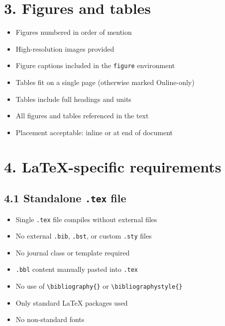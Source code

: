 \documentclass[11pt]{article}
\begin{document}
\begin{Form}
\section*{3. Figures and tables}

\begin{itemize}[leftmargin=1.5cm]
    \item \CheckBox{} Figures numbered in order of mention
    \item \CheckBox{} High-resolution images provided
    \item \CheckBox{} Figure captions included in the \texttt{figure} environment
    \item \CheckBox{} Tables fit on a single page (otherwise marked Online-only)
    \item \CheckBox{} Tables include full headings and units
    \item \CheckBox{} All figures and tables referenced in the text
    \item \CheckBox{} Placement acceptable: inline or at end of document
\end{itemize}

\section*{4. LaTeX-specific requirements}

\subsection*{4.1 Standalone \texttt{.tex} file}

\begin{itemize}[leftmargin=1.5cm]
    \item \CheckBox{} Single \texttt{.tex} file compiles without external files
    \item \CheckBox{} No external \texttt{.bib}, \texttt{.bst}, or custom \texttt{.sty} files
    \item \CheckBox{} No journal class or template required
    \item \CheckBox{} \texttt{.bbl} content manually pasted into \texttt{.tex}
    \item \CheckBox{} No use of \texttt{\textbackslash bibliography\{\}} or \texttt{\textbackslash bibliographystyle\{\}}
    \item \CheckBox{} Only standard LaTeX packages used
    \item \CheckBox{} No non-standard fonts
\end{itemize}


\end{Form}
\end{document}

